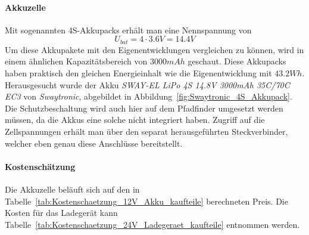 \documentclass[main.tex]{subfiles} %
\begin{document}
\paragraph{Akkuzelle}

Mit sogenannten 4S-Akkupacks erhält man eine Nennspannung von
\[
    U_{bat} = 4 \cdot 3.6V = 14.4V
\]
Um diese Akkupakete mit den Eigenentwicklungen vergleichen zu können, wird in
einem ähnlichen Kapazitätsbereich von $3000mAh$ geschaut. Diese Akkupacks haben
praktisch den gleichen Energieinhalt wie die Eigenentwicklung mit $43.2Wh$.
Herausgesucht wurde der Akku \textit{SWAY-EL LiPo 4S 14.8V 3000mAh 35C/70C EC3
} von \textit{Swaytronic}, abgebildet in
Abbildung~\ref{fig:Swaytronic_4S_Akkupack}. Die Schutzbeschaltung wird auch
hier auf dem Pfadfinder umgesetzt werden müssen, da die Akkus eine solche nicht
integriert haben. Zugriff auf die Zellspannungen erhält man über den separat
herausgeführten Steckverbinder, welcher eben genau diese Anschlüsse
bereitstellt.

\paragraph{Kostenschätzung}

Die Akkuzelle beläuft sich auf den in
Tabelle~\ref{tab:Kostenschaetzung_12V_Akku_kaufteile} berechneten Preis. Die
Kosten für das Ladegerät kann
Tabelle~\ref{tab:Kostenschaetzung_24V_Ladegeraet_kaufteile} entnommen werden.
\end{document}

